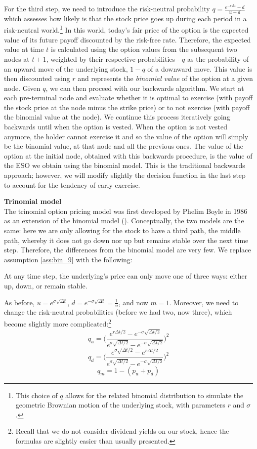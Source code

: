 For the third step, we need to introduce the risk-neutral probability $q = \frac{e^{-r \Delta t} - d}{u-d}$ which assesses how likely is that the stock price goes up during each period in a risk-neutral world.\footnote{This choice of $q$ allows for the related binomial distribution to simulate the geometric Brownian motion of the underlying stock, with parameters $r$ and $\sigma$.} In this world, today's fair price of the option is the expected value of its future payoff discounted by the risk-free rate. Therefore, the expected value at time $t$ is calculated using the option values from the subsequent two nodes at $t+1$, weighted by their respective probabilities - $q$ as the probability of an upward move of the underlying stock, $1-q$ of a downward move. This value is then discounted using $r$ and represents the \textit{binomial value} of the option at a given node. 
Given $q$, we can then proceed with our backwards algorithm. We start at each pre-terminal node and evaluate whether it is optimal to exercise (with payoff the stock price at the node minus the strike price) or to not exercise (with payoff the binomial value at the node). We continue this process iteratively going backwards until when the option is vested. When the option is not vested anymore, the holder cannot exercise it and so the value of the option will simply be the binomial value, at that node and all the previous ones.
The value of the option at the initial node, obtained with this backwards procedure, is the value of the ESO we obtain using the binomial model.
This is the traditional backwards approach; however, we will modify slightly the decision function in the last step to account for the tendency of early exercise.


\textbf{Trinomial model}\\
The trinomial option pricing model was  first developed by Phelim Boyle in 1986 as an extension of the binomial model (\cite{boyle1986option}). Conceptually, the two models are the same: here we are only allowing for the stock to have a third path, the middle path, whereby it does not go down nor up but remains stable over the next time step. Therefore, the differences from the binomial model are very few. We replace assumption \ref*{ass:bin_9} with the following:
\begin{assumption}
    \label{ass:trin_10}
    At any time step, the underlying's price can only move one of three ways: either up, down, or remain stable.
\end{assumption}
As before, $u = e^{\sigma \sqrt{\Delta t}}$, $d = e^{-\sigma \sqrt{\Delta t}}=\frac{1}{u}$, and now $m=1$. Moreover, we need to change the risk-neutral probabilities (before we had two, now three), which become slightly more complicated:\footnote{Recall that we do not consider dividend yields on our stock, hence the formulas are slightly easier than usually presented.}
$$ q_u = \Biggl(\frac{e^{r \Delta t / 2} - e^{-\sigma \sqrt{\Delta t / 2}}}{e^{\sigma \sqrt{\Delta t / 2}} - e^{-\sigma \sqrt{\Delta t / 2}}}\Biggr)^2 $$
$$ q_d = \Biggl(\frac{e^{\sigma \sqrt{\Delta t / 2}} - e^{r \Delta t / 2}}{e^{\sigma \sqrt{\Delta t / 2}} - e^{-\sigma \sqrt{\Delta t / 2}}}\Biggr)^2 $$
$$ q_m = 1 - (p_u + p_d) $$

